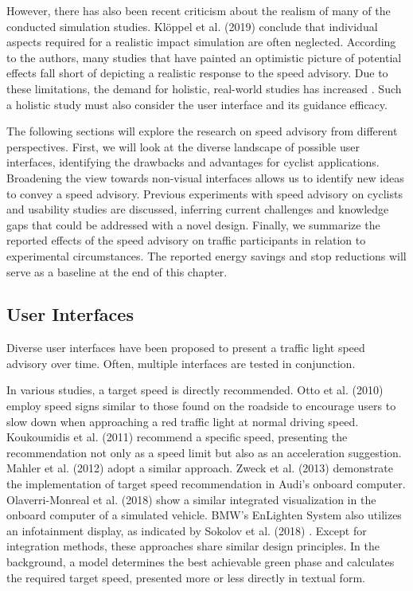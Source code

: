 However, there has also been recent criticism about the realism of many of the conducted simulation studies. Klöppel et al. (2019) \cite{kloeppel_performance_2019} conclude that individual aspects required for a realistic impact simulation are often neglected. According to the authors, many studies that have painted an optimistic picture of potential effects fall short of depicting a realistic response to the speed advisory. Due to these limitations, the demand for holistic, real-world studies has increased \cite{stahlmann_exploring_2018}. Such a holistic study must also consider the user interface and its guidance efficacy. 

The following sections will explore the research on speed advisory from different perspectives. First, we will look at the diverse landscape of possible user interfaces, identifying the drawbacks and advantages for cyclist applications. Broadening the view towards non-visual interfaces allows us to identify new ideas to convey a speed advisory. Previous experiments with speed advisory on cyclists and usability studies are discussed, inferring current challenges and knowledge gaps that could be addressed with a novel design. Finally, we summarize the reported effects of the speed advisory on traffic participants in relation to experimental circumstances. The reported energy savings and stop reductions will serve as a baseline at the end of this chapter.

\subsection{User Interfaces}

Diverse user interfaces have been proposed to present a traffic light speed advisory over time. Often, multiple interfaces are tested in conjunction.

In various studies, a target speed is directly recommended. Otto et al. (2010) \cite{otto_operating_2010} employ speed signs similar to those found on the roadside to encourage users to slow down when approaching a red traffic light at normal driving speed. Koukoumidis et al. (2011) \cite{koukoumidis_signalguru_2011, koukoumidis_leveraging_2012} recommend a specific speed, presenting the recommendation not only as a speed limit but also as an acceleration suggestion. Mahler et al. (2012) \cite{mahler_reducing_2012} adopt a similar approach. Zweck et al. (2013) \cite{zweck_traffic_2013} demonstrate the implementation of target speed recommendation in Audi's onboard computer. Olaverri-Monreal et al. (2018) \cite{olaverri-monreal_implementation_2018} show a similar integrated visualization in the onboard computer of a simulated vehicle. BMW's EnLighten System also utilizes an infotainment display, as indicated by Sokolov et al. (2018) \cite{sokolov_effects_2018}. Except for integration methods, these approaches share similar design principles. In the background, a model determines the best achievable green phase and calculates the required target speed, presented more or less directly in textual form.

